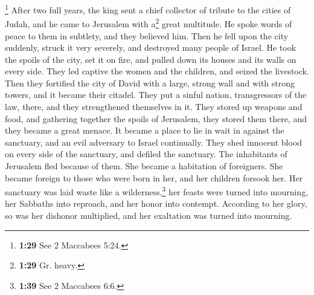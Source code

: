  \footnote{\textbf{1:29} See 2 Maccabees 5:24.} After two
full years, the king sent a chief collector of tribute to the cities of
Judah, and he came to Jerusalem with a\footnote{\textbf{1:29} Gr. heavy.}
great multitude.  He spoke words of peace to them in
subtlety, and they believed him. Then he fell upon the city suddenly,
struck it very severely, and destroyed many people of Israel.
 He took the spoils of the city, set it on fire, and
pulled down its houses and its walls on every side.  They
led captive the women and the children, and seized the livestock.
 Then they fortified the city of David with a large,
strong wall and with strong towers, and it became their citadel.
 They put a sinful nation, transgressors of the law,
there, and they strengthened themselves in it.  They
stored up weapons and food, and gathering together the spoils of
Jerusalem, they stored them there, and they became a great menace.
 It became a place to lie in wait in against the
sanctuary, and an evil adversary to Israel continually. 
They shed innocent blood on every side of the sanctuary, and defiled the
sanctuary.  The inhabitants of Jerusalem fled because of
them. She became a habitation of foreigners. She became foreign to those
who were born in her, and her children forsook her.  Her
sanctuary was laid waste like a wilderness,\footnote{\textbf{1:39} See 2
  Maccabees 6:6.} her feasts were turned into mourning, her Sabbaths
into reproach, and her honor into contempt.  According to
her glory, so was her dishonor multiplied, and her exaltation was turned
into mourning.

